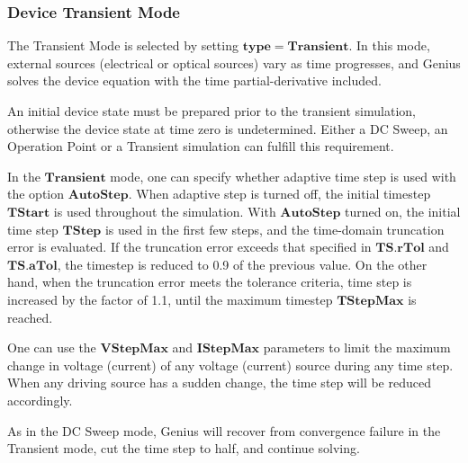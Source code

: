 \documentclass[oneside,12pt]{cgd_book}
\begin{document}
\subsubsection{Device Transient Mode}
The Transient Mode is selected by setting $\mathbf{type=Transient}$. In this mode, external
          sources (electrical or optical sources) vary as time progresses, and Genius solves the device equation with
          the time partial-derivative included.
\par
{}An initial device state must be prepared prior to the transient simulation, otherwise the device state
            at time zero is undetermined. Either a DC Sweep, an Operation Point or a Transient simulation can fulfill
            this requirement.
\par
\par
{}In the $\mathbf{Transient}$ mode, one can specify whether adaptive time step is used with
            the option $\mathbf{AutoStep}$. When adaptive step is turned off, the initial timestep
$\mathbf{TStart}$ is used throughout the simulation. With $\mathbf{AutoStep}$
turned
            on, the initial time step $\mathbf{TStep}$ is used in the first few steps, and the time-domain
            truncation error is evaluated. If the truncation error exceeds that specified in
$\mathbf{TS.rTol}$ and $\mathbf{TS.aTol}$, the timestep is reduced to 0.9 of the
            previous value. On the other hand, when the truncation error meets the tolerance criteria, time step is
            increased by the factor of 1.1, until the maximum timestep
$\mathbf{TStepMax}$ is
            reached.
\par
\par
One can use the $\mathbf{VStepMax}$ and $\mathbf{IStepMax}$ parameters to limit
          the maximum change in voltage (current) of any voltage (current) source during any time step. When any driving
          source has a sudden change, the time step will be reduced accordingly.
\par
As in the DC Sweep mode, Genius will recover from convergence failure in the Transient mode, cut the
          time step to half, and continue solving.
\par
\end{document}
